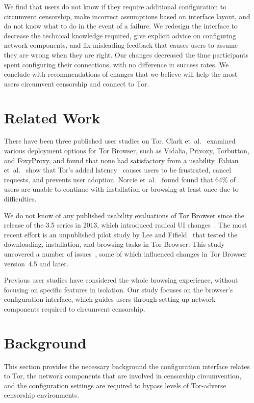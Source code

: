 \documentclass[USenglish,oneside,twocolumn]{article}
\begin{document}
We find that users do not know if they require additional configuration to circumvent censorship, make incorrect assumptions based on interface layout, and do not know what to do in the event of a failure. We redesign the interface to decrease the technical knowledge required, give explicit advice on configuring network components, and fix misleading feedback that causes users to assume they are wrong when they are right. Our changes decreased the time participants spent configuring their connections, with no difference in success rates. We conclude with recommendations of changes that we believe will help the most users circumvent censorship and connect to Tor. 

\section{Related Work} 
There have been three published user studies on Tor. Clark et~al.~\cite{clark2007usability} examined various deployment
options for Tor Browser, such as Vidalia, Privoxy, Torbutton, and FoxyProxy, and found that none had satisfactory from a usability. Fabian et~al.~\cite{fabian2010privately} show that Tor's added
latency~\cite{dingledine2009performance} causes users
to be frustrated, cancel requests, and prevents user adoption. 
Norcie et~al.~\cite{norcie2012eliminating} found found that 
64\% of users are unable to continue with installation or browsing at least once due to difficulties.

We do not know of any published usability evaluations of
Tor Browser since the release of the 3.5 series in 2013, which introduced radical UI changes~\cite{torbrowser-35}.
The most recent effort is an unpublished pilot study by Lee and Fifield~\cite{uxsprint} 
that tested the downloading, installation, and browsing tasks in Tor Browser.  This study uncovered a number of issues~\cite{uxsprint2015-tickets},
some of which influenced changes in Tor Browser version~4.5 and later.

Previous user studies have considered the whole browsing experience,
without focusing on specific features in isolation.
Our study focuses on 
the browser's configuration interface, which guides users through setting up network components required to circumvent censorship. 

\section{Background}
This section provides the necessary background the configuration interface relates to Tor, the network components that are involved in censorship circumvention, and the configuration settings are required to bypass levels of Tor-adverse censorship environments. 
\end{document}
